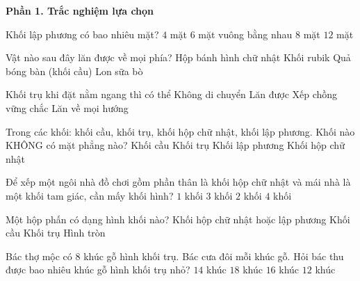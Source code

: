 \textbf{Phần 1. Trắc nghiệm lựa chọn}

\begin{ex} %
Khối lập phương có bao nhiêu mặt?
\choice
{$4$ mặt}
{\True $6$ mặt vuông bằng nhau}
{$8$ mặt}
{$12$ mặt}
\end{ex}

\begin{ex} %
Vật nào sau đây lăn được về mọi phía?
\choice
{Hộp bánh hình chữ nhật}
{Khối rubik}
{\True Quả bóng bàn (khối cầu)}
{Lon sữa bò}
\end{ex}

\begin{ex} %
Khối trụ khi đặt nằm ngang thì có thể
\choice
{Không di chuyển}
{\True Lăn được}
{Xếp chồng vững chắc}
{Lăn về mọi hướng}
\end{ex}

\begin{ex} %
Trong các khối: khối cầu, khối trụ, khối hộp chữ nhật, khối lập phương. Khối nào KHÔNG có mặt phẳng nào?
\choice
{\True Khối cầu}
{Khối trụ}
{Khối lập phương}
{Khối hộp chữ nhật}
\end{ex}

\begin{ex} %
Để xếp một ngôi nhà đồ chơi gồm phần thân là khối hộp chữ nhật và mái nhà là một khối tam giác, cần mấy khối hình?
\choice
{$1$ khối}
{$3$ khối}
{\True $2$ khối}
{$4$ khối}
\end{ex}

\begin{ex} %
Một hộp phấn có dạng hình khối nào?
\choice
{\True Khối hộp chữ nhật hoặc lập phương}
{Khối cầu}
{Khối trụ}
{Hình tròn}
\end{ex}

\begin{ex} %
Bác thợ mộc có 8 khúc gỗ hình khối trụ. Bác cưa đôi mỗi khúc gỗ. Hỏi bác thu được bao nhiêu khúc gỗ hình khối trụ nhỏ?
\choice
{$14$ khúc}
{$18$ khúc}
{\True $16$ khúc}
{$12$ khúc}
\end{ex}

